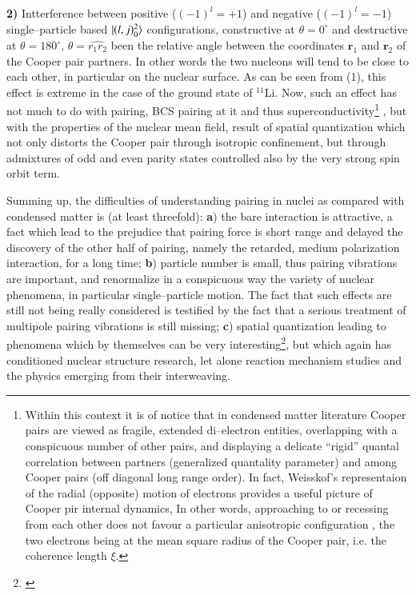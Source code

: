 \begin{subappendices}
    				
 \textbf{2)} Intterference between positive ($(-1)^l=+1$) and negative ($(-1)^l=-1$) single--particle based $|{(l,j)^2_0} \rangle$ configurations, constructive at $\theta=0^\circ$ and destructive at $\theta=180^\circ$, $\theta=\hat{r_1r_2}$ been the relative angle between the coordinates $\mathbf r_1$ and $\mathbf r_2$ of the Cooper pair partners. In other words the two nucleons will tend to be close to each other, in particular on the nuclear surface. As can be seen from (1), this effect is extreme in the case of the ground state of $^{11}$Li. Now, such an effect has not much to do with pairing, BCS pairing at it and thus superconductivity\footnote{Within this context it is of notice that in condensed matter literature Cooper pairs are viewed as fragile, extended di--electron entities, overlapping with a conspicuous number of other pairs, and displaying a delicate ``rigid'' quantal correlation between partners (generalized quantality parameter) and among Cooper pairs (off diagonal long range order). In fact, Weisskof's representaion of the radial (opposite) motion of electrons provides a useful picture of Cooper pir internal dynamics, In other words, approaching to or recessing from each other does not favour a particular anisotropic configuration , the two electrons being at the mean square radius of the Cooper pair, i.e. the coherence length $\xi$.}		, but with the properties of the nuclear mean field, result of spatial quantization which not only distorts the Cooper pair through isotropic confinement, but through admixtures of odd and even parity states controlled also by the very strong spin orbit term.									

    Summing up, the difficulties of understanding pairing in nuclei as compared with condensed matter is (at least threefold): \textbf{a}) the bare interaction is attractive, a fact which lead to the prejudice that pairing force is short range and delayed the discovery of the other half of pairing, namely the retarded, medium polarization interaction, for a long time; \textbf{b}) particle number is small, thus pairing vibrations are important, and renormalize in a conspicuous way the variety of nuclear phenomena, in particular single--particle motion. The fact that such effects are still not being really considered is testified by the fact that a serious treatment of multipole pairing vibrations is still missing; \textbf{c}) spatial quantization leading to phenomena which by themselves can be very interesting\footnote{\cite{Bertsch:67,Ferreira:84,Lotti:89,Matsuo:06,Matsuo:13}}, but which again has conditioned nuclear structure research, let alone reaction mechanism studies and the physics emerging from their interweaving.

\end{subappendices}
